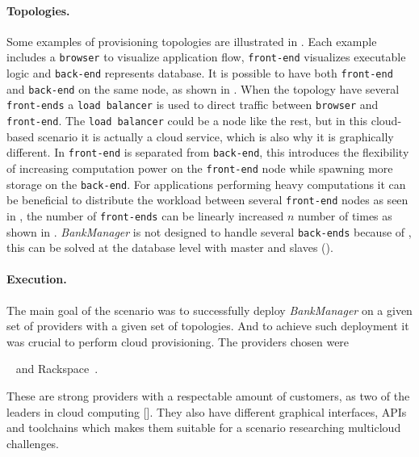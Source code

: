 \paragraph{Topologies.}



Some examples of provisioning topologies are illustrated in .
Each example includes a \texttt{browser} to visualize application flow,
\texttt{front-end} visualizes executable logic and \texttt{back-end} represents database.
It is possible to have both \texttt{front-end} and \texttt{back-end} on the same node, 
as shown in .
When the topology have several \texttt{front-ends} a \texttt{load balancer} is used
to direct traffic between \texttt{browser} and \texttt{front-end}.
The \texttt{load balancer} could be a node like the rest, but in this cloud-based scenario
it is actually a cloud service, which is also why it is graphically different.
In  \texttt{front-end} is separated from \texttt{back-end},
this introduces the flexibility of increasing computation power on the \texttt{front-end} node while spawning more
storage on the \texttt{back-end}.
For applications performing heavy computations it can be beneficial to distribute the workload between several
\texttt{front-end} nodes as seen in , the number of \texttt{front-ends} can be linearly increased
$n$ number of times as shown in .
\emph{BankManager} is not designed to handle several \texttt{back-ends} because of ,
this can be solved at the database level with master and slaves ().

\paragraph{Execution.}

The main goal of the scenario was to successfully deploy \emph{BankManager}
on a given set of providers with a given set of topologies.
And to achieve such deployment it was crucial to perform cloud provisioning.
The providers chosen were 
\begin{ii}
  \iitem {}~\cite{aws} and
  \iitem Rackspace~\cite{rackspace}.
\end{ii}
These are strong providers with a respectable amount of customers, as two of the leaders in cloud computing
[].
They also have different graphical interfaces, APIs and toolchains which makes them suitable
for a scenario researching multicloud challenges.

